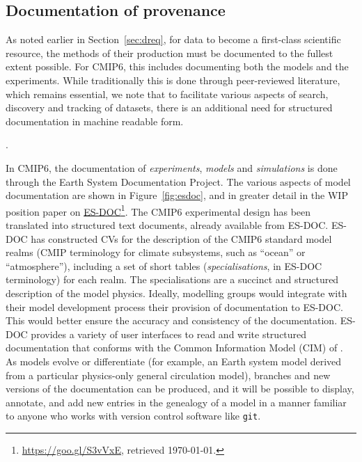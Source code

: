 \documentclass[gmd,manuscript]{copernicus}
\newcommand{\urlref}[2] {\href{#1}{#2}\footnote{\url{#1}, retrieved \today.}}
\begin{document}
\subsection{Documentation of provenance}
\label{sec:doc}

As noted earlier in Section~\ref{sec:dreq}, for data to become a
first-class scientific resource, the methods of their production must
be documented to the fullest extent possible. For CMIP6, this includes
documenting both the models and the experiments. While traditionally
this is done through peer-reviewed literature, which remains
essential, we note that to facilitate various aspects of search,
discovery and tracking of datasets, there is an additional need for
structured documentation in machine readable form.

\begin{figure*}
  \begin{center}
  \end{center}
  \caption{Elements of ES-DOC documentation. Rows indicate phases of
    the modelling process being documented, and box colors indicate the
    parties responsible for producing the documentation (see legend).
    Figure courtesy Guillaume Levavasseur, IPSL}.
  \label{fig:esdoc}
\end{figure*}

In CMIP6, the documentation of \emph{experiments}, \emph{models} and
\emph{simulations} is done through the Earth System Documentation
\citep[\urlref{https://goo.gl/WNwKD9}{ES-DOC},][]{ref:guilyardietal2013}
Project. The various aspects of model documentation are shown in
Figure~\ref{fig:esdoc}, and in greater detail in the WIP position
paper on \urlref{https://goo.gl/S3vVxE}{ES-DOC}. The CMIP6
experimental design has been translated into structured text
documents, already available from ES-DOC. ES-DOC has constructed CVs
for the description of the CMIP6 standard model realms
(CMIP terminology for climate subsystems, such as ``ocean'' or
``atmosphere''), including a set of short tables
(\emph{specialisations}, in ES-DOC terminology) for each realm.
The specialisations are a succinct and structured description of the
model physics. Ideally, modelling groups would integrate with their
model development process their provision of documentation to ES-DOC.
This would better ensure the accuracy and consistency of the
documentation. ES-DOC provides a variety of user interfaces to read
and write structured documentation that conforms with the Common
Information Model (CIM) of \cite{ref:lawrenceetal2012}. As models
evolve or differentiate (for example, an Earth system model derived
from a particular physics-only general circulation model), branches and new
versions of the documentation can be produced,
and it will be possible to display, annotate, and add new entries in
the genealogy of a model in a manner familiar to anyone who works with
version control software like \texttt{git}.
\end{document}
